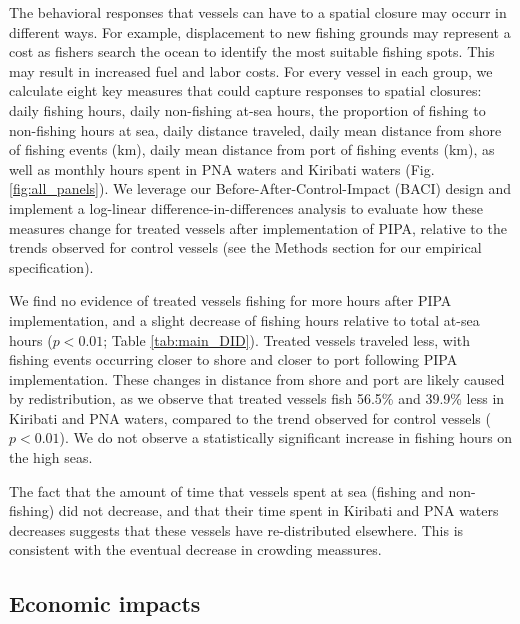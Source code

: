 \documentclass[9p,twocolumn,twoside,lineno]{pnas-new}
\begin{document}
The behavioral responses that vessels can have to a spatial closure may occurr in different ways. For example, displacement to new fishing grounds may represent a cost as fishers search the ocean to identify the most suitable fishing spots. This may result in increased fuel and labor costs. For every vessel in each group, we calculate eight key measures that could capture responses to spatial closures: daily fishing hours, daily non-fishing at-sea hours, the proportion of fishing to non-fishing hours at sea, daily distance traveled, daily mean distance from shore of fishing events (km), daily mean distance from port of fishing events (km), as well as monthly hours spent in PNA waters and Kiribati waters (Fig. \ref{fig:all_panels}). We leverage our Before-After-Control-Impact (BACI) design and implement a log-linear difference-in-differences analysis to evaluate how these measures change for treated vessels after implementation of PIPA, relative to the trends observed for control vessels (see the Methods section for our empirical specification).

We find no evidence of treated vessels fishing for more hours after PIPA implementation, and a slight decrease of fishing hours relative to total at-sea hours ($p < 0.01$; Table \ref{tab:main_DID}). Treated vessels traveled less, with fishing events occurring closer to shore and closer to port following PIPA implementation. These changes in distance from shore and port are likely caused by redistribution, as we observe that treated vessels fish 56.5\% and 39.9\% less in Kiribati and PNA waters, compared to the trend observed for control vessels ($p < 0.01$). We do not observe a statistically significant increase in fishing hours on the high seas. 

The fact that the amount of time that vessels spent at sea (fishing and non-fishing) did not decrease, and that their time spent in Kiribati and PNA waters decreases suggests that these vessels have re-distributed elsewhere. This is consistent with the eventual decrease in crowding meassures.

\subsection{Economic impacts}
\end{document}
